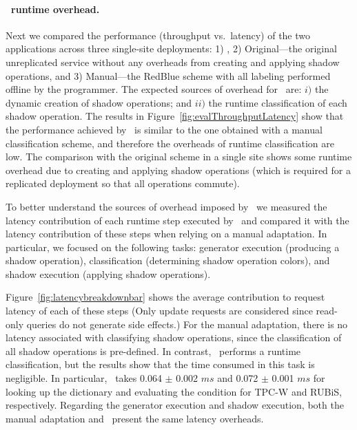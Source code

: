 \paragraph{\tool\ runtime overhead.} Next we compared the performance
(throughput vs.\ latency) of the two applications across three
single-site deployments: 1) \tool, 2) Original---the original unreplicated
service without any overheads from creating and applying shadow
operations, and 3) Manual---the RedBlue scheme with all labeling
performed offline by the programmer. The expected sources of overhead
for \tool\ are: $i)$ the dynamic creation of shadow operations; and
$ii)$ the runtime classification of each shadow operation.  The
results in Figure~\ref{fig:evalThroughputLatency} show that the
performance achieved by \tool\ is similar to the one obtained with a
manual classification scheme, and therefore the overheads of runtime
classification are low. The comparison with the original scheme in a
single site shows some runtime overhead due to creating and applying
shadow operations (which is required for a replicated deployment so
that all operations commute).

To better understand the sources of overhead imposed by \tool\ we
measured the latency contribution of each runtime step executed
by \tool\ and compared it with the latency contribution of these steps when relying on a manual
adaptation. In particular, we focused on the following tasks: generator execution (producing a shadow operation), classification (determining
shadow operation colors), and shadow execution (applying shadow operations). 

Figure~\ref{fig:latencybreakdownbar} shows the average contribution to request latency of
each of these steps (Only update requests are considered
since read-only queries do not generate side effects.) For the manual adaptation, there is no latency associated with classifying shadow operations, 
since the classification of all shadow operations is pre-defined. In contrast,
\tool\  performs a runtime classification, but the results show that the time consumed in this task is negligible. 
In particular,
 \tool\ takes 0.064 $\pm$ 0.002 $ms$ and
0.072 $\pm$ 0.001 $ms$ for looking up the dictionary and evaluating
the condition for TPC-W and RUBiS, respectively. Regarding the
generator execution and shadow execution, both the manual adaptation and \tool\ present
the same latency overheads.



